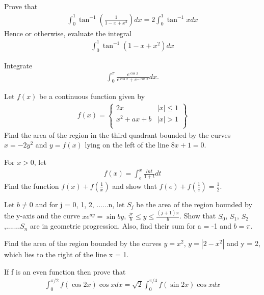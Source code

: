 \item Prove that
\begin{align*}
\int_{0}^{1}\tan^{-1}\left(\frac{1}{1 - x + x^2}\right) dx = 2\int_{0}^{1}\tan^{-1}xdx
\end{align*}
Hence or otherwise, evaluate the integral
\begin{align*}
\int_{0}^{1}\tan^{-1}\left(1 - x + x^{2}\right) dx
\end{align*}

\item Integrate
\begin{align*}
\int_{0}^{\pi}\frac{e^{\cos x}}{e^{\cos x} + e^{-\cos x}}dx.
\end{align*}

\item Let $f(x)$ be a continuous function given by
\begin{align*}
f(x) = 
\left\lbrace
\begin{array}{ll}
      2x & |x| \leq 1 \\
      x^2 + ax + b & |x| > 1 \\
\end{array} 
\right\rbrace
\end{align*}
Find the area of the region in the third quadrant bounded by the curves $x = -2y^{2}$ and $y = f(x)$ lying on the left of the line $8x + 1 = 0$.

\item For $x > 0$, let 
\begin{align*}
f(x) = \int_{e}^{x}\frac{ln t}{1 + t}dt
\end{align*}
Find the function $f(x) + f(\frac{1}{x})$ and show that $f(e) + f(\frac{1}{e}) = \frac{1}{2}$.

\item Let $b \neq 0$ and for j = 0, 1, 2, ......n, let $S_j$ be the area of the region bounded by the y-axis and the curve $xe^{ay} = \sin by$, $\frac{jr}{b} \leq y \leq \frac{(j + 1)\pi}{b}$. Show that $S_0$, $S_1$, $S_2$,.......$S_n$ are in geometric progression. Also, find their sum for a = -1 and $b = \pi$.

\item Find the area of the region bounded by the curves $y = x^2$, $y = |2 - x^2|$ and y = 2, which lies to the right of the line x = 1.

\item If f is an even function then prove that
\begin{align*}
\int_{0}^{\pi/2}f(\cos 2x)\cos x dx = \sqrt{2}\int_{0}^{\pi/4}f(\sin 2x)\cos x dx
\end{align*}

